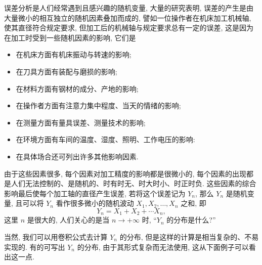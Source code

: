 \begin{example}\label{exam:4.4.1}
    误差分析是人们经常遇到且感兴趣的随机变量, 大量的研究表明, 误差的产生是由大量微小的相互独立的随机因素叠加而成的, 譬如一位操作者在机床加工机械轴, 使其直径符合规定要求, 但加工后的机械轴与规定要求总有一定的误差, 这是因为在加工时受到一些随机因素的影响, 它们是
    \begin{itemize}
        \item 在机床方面有机床振动与转速的影响;
        \item 在刀具方面有装配与磨损的影响;
        \item 在材料方面有钢材的成分、产地的影响;
        \item 在操作者方面有注意力集中程度、当天的情绪的影响;
        \item 在测量方面有量具误差、测量技术的影响;
        \item 在环境方面有车间的温度、湿度、照明、工作电压的影响:
        \item 在具体场合还可列出许多其他影响因素.
    \end{itemize}
    由于这些因素很多, 每个因素对加工精度的影响都是很微小的, 每个因素的出现都是人们无法控制的、是随机的、时有时无、时大时小、时正时负.
    这些因素的综合影响最后使每个加工轴的直径产生误差, 若将这个误差记为 $ Y_n $, 那么 $ Y_n $ 是随机变量, 且可以将 $ Y_n $ 看作很多微小的随机波动 $ X_1, X_2, \dotsc, X_n $ 之和, 即
    \begin{equation*}
        Y_n = X_1 + X_2 + \dotsb X_n,
    \end{equation*}
    这里 $ n $ 是很大的, 人们关心的是当 $ n \to +\infty $ 时, ``$ Y_n $ 的分布是什么?''
\end{example}

当然, 我们可以用卷积公式去计算 $ Y_n $ 的分布, 但是这样的计算是相当复杂的、不易实现的.
有的可写出 $ Y_n $ 的分布, 由于其形式复杂而无法使用, 这从下面例子可以看出这一点.

